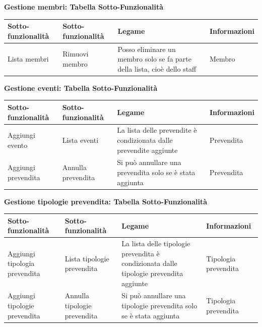 \documentclass[a4paper]{article}
\begin{document}
\textbf{Gestione membri: Tabella Sotto-Funzionalità}

\begin{center}
    \begin{tabularx}{1\textwidth}{|X|X|X|X|}
    \hline
    \textbf{Sotto-funzionalità} & \textbf{Sotto-funzionalità} & \textbf{Legame} & \textbf{Informazioni}\\
    \hline
    \hline
    Lista membri & Rimuovi membro & Posso eliminare un membro solo se fa parte della lista, cioè dello staff & Membro\\
    \hline
    \end{tabularx}
\end{center}

\textbf{Gestione eventi: Tabella Sotto-Funzionalità}

\begin{center}
    \begin{tabularx}{1\textwidth}{|X|X|X|X|}
    \hline
    \textbf{Sotto-funzionalità} & \textbf{Sotto-funzionalità} & \textbf{Legame} & \textbf{Informazioni}\\
    \hline
    \hline
    Aggiungi evento & Lista eventi & La lista delle prevendite è condizionata dalle prevendite aggiunte & Prevendita\\
    \hline
    Aggiungi prevendita & Annulla prevendita & Si può annullare una prevendita solo se è stata aggiunta & Prevendita\\
    \hline
    \end{tabularx}
\end{center}

\textbf{Gestione tipologie prevendita: Tabella Sotto-Funzionalità}

\begin{center}
    \begin{tabularx}{1\textwidth}{|X|X|X|X|}
    \hline
    \textbf{Sotto-funzionalità} & \textbf{Sotto-funzionalità} & \textbf{Legame} & \textbf{Informazioni}\\
    \hline
    \hline
    Aggiungi tipologia prevendita & Lista tipologie prevendita & La lista delle tipologie prevendita è condizionata dalle tipologie prevendita aggiunte & Tipologia prevendita\\
    \hline
    Aggiungi tipologie prevendita & Annulla tipologie prevendita & Si può annullare una tipologie prevendita solo se è stata aggiunta & Tipologia prevendita\\
    \hline
    \end{tabularx}
\end{center}
\end{document}
